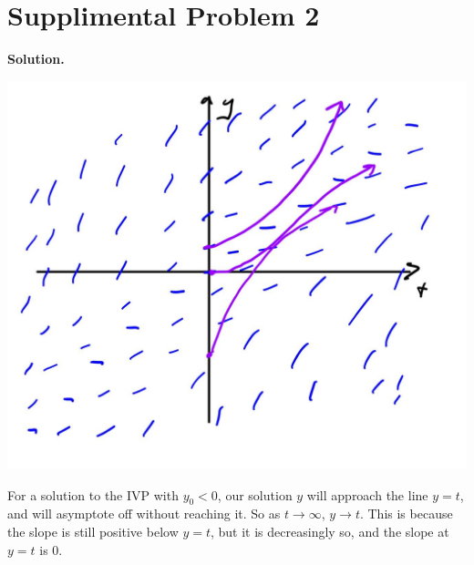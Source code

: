 \documentclass[11pt, letterpaper]{report}
\newenvironment{soln}[1][]{\noindent\textbf{Solution. }}{\hfill\qedsymbol}
\begin{document}
\section*{Supplimental Problem 2}
\begin{soln}
	\begin{center}
		\includegraphics[scale=0.3]{slowo.jpg}
	\end{center}
	For a solution to the IVP with $y_0 < 0$, our solution $y$ will approach the line $y=t$, and will asymptote off without reaching it. So as $t\to \infty$, $y\to t$. This is because the slope is still positive below $y=t$, but it is decreasingly so, and the slope at $y=t$ is 0.


\end{soln}
\end{document}
